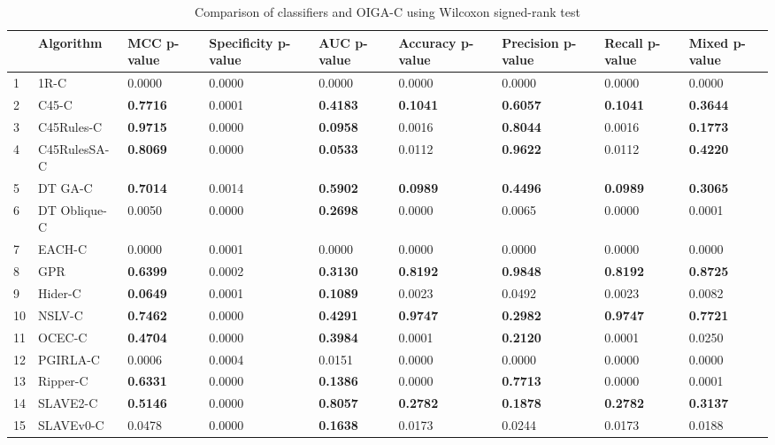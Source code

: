\begin{table}
\footnotesize
\caption{Comparison of classifiers and OIGA-C using Wilcoxon signed-rank test}
\label{tab:wilcoxon comparison}
\begin{tabular}{lllllllll}
\hline
 & Algorithm & MCC p-value & Specificity p-value & AUC p-value & Accuracy p-value & Precision p-value & Recall p-value & Mixed p-value \\
\hline
1 & 1R-C & 0.0000 & 0.0000 & 0.0000 & 0.0000 & 0.0000 & 0.0000 & 0.0000 \\
2 & C45-C & \textbf{0.7716} & 0.0001 & \textbf{0.4183} & \textbf{0.1041} & \textbf{0.6057} & \textbf{0.1041} & \textbf{0.3644} \\
3 & C45Rules-C & \textbf{0.9715} & 0.0000 & \textbf{0.0958} & 0.0016 & \textbf{0.8044} & 0.0016 & \textbf{0.1773} \\
4 & C45RulesSA-C & \textbf{0.8069} & 0.0000 & \textbf{0.0533} & 0.0112 & \textbf{0.9622} & 0.0112 & \textbf{0.4220} \\
5 & DT GA-C & \textbf{0.7014} & 0.0014 & \textbf{0.5902} & \textbf{0.0989} & \textbf{0.4496} & \textbf{0.0989} & \textbf{0.3065} \\
6 & DT Oblique-C & 0.0050 & 0.0000 & \textbf{0.2698} & 0.0000 & 0.0065 & 0.0000 & 0.0001 \\
7 & EACH-C & 0.0000 & 0.0001 & 0.0000 & 0.0000 & 0.0000 & 0.0000 & 0.0000 \\
8 & GPR & \textbf{0.6399} & 0.0002 & \textbf{0.3130} & \textbf{0.8192} & \textbf{0.9848} & \textbf{0.8192} & \textbf{0.8725} \\
9 & Hider-C & \textbf{0.0649} & 0.0001 & \textbf{0.1089} & 0.0023 & 0.0492 & 0.0023 & 0.0082 \\
10 & NSLV-C & \textbf{0.7462} & 0.0000 & \textbf{0.4291} & \textbf{0.9747} & \textbf{0.2982} & \textbf{0.9747} & \textbf{0.7721} \\
11 & OCEC-C & \textbf{0.4704} & 0.0000 & \textbf{0.3984} & 0.0001 & \textbf{0.2120} & 0.0001 & 0.0250 \\
12 & PGIRLA-C & 0.0006 & 0.0004 & 0.0151 & 0.0000 & 0.0000 & 0.0000 & 0.0000 \\
13 & Ripper-C & \textbf{0.6331} & 0.0000 & \textbf{0.1386} & 0.0000 & \textbf{0.7713} & 0.0000 & 0.0001 \\
14 & SLAVE2-C & \textbf{0.5146} & 0.0000 & \textbf{0.8057} & \textbf{0.2782} & \textbf{0.1878} & \textbf{0.2782} & \textbf{0.3137} \\
15 & SLAVEv0-C & 0.0478 & 0.0000 & \textbf{0.1638} & 0.0173 & 0.0244 & 0.0173 & 0.0188 \\
\hline
\end{tabular}
\end{table}
